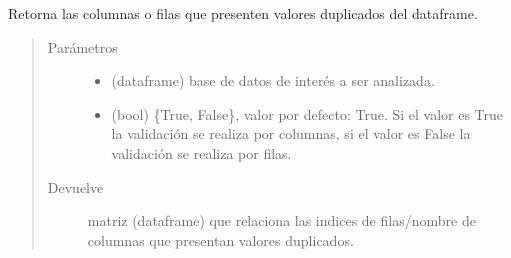 \documentclass[letterpaper,10pt,openany,spanish]{sphinxmanual}
\begin{document}
\begin{fulllineitems}
\label{\detokenize{datos:datos.duplic}}
Retorna las columnas o filas que presenten valores duplicados del dataframe.
\begin{quote}\begin{description}
\item[{Parámetros}] \leavevmode\begin{itemize}
\item {} 
 \textendash{} (dataframe) base de datos de interés a ser analizada.

\item {} 
 \textendash{} (bool) \{True, False\}, valor por defecto: True. Si el valor es True la validación se realiza por columnas, si el valor es False la validación se realiza por filas.

\end{itemize}

\item[{Devuelve}] \leavevmode
matriz (dataframe) que relaciona las indices de filas/nombre de columnas que presentan valores duplicados.

\end{description}\end{quote}

\end{fulllineitems}

\end{document}
